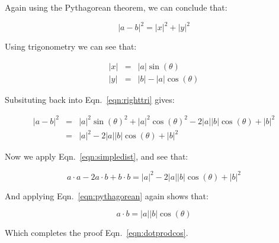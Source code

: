 \documentclass{article}[11pt]
\begin{document}
Again using the Pythagorean theorem, we can conclude that:

\begin{equation}
\label{eqn:righttri}
|a - b|^2 = |x|^2 + |y|^2
\end{equation}

Using trigonometry we can see that:

\begin{eqnarray*}
|x| & = & |a| \sin(\theta) \\
|y| & = & |b| - |a| \cos(\theta)
\end{eqnarray*}

Subsituting back into Eqn.~\ref{eqn:righttri} gives:

\begin{eqnarray*}
|a - b|^2  & = & |a|^2 \sin(\theta)^2 + |a|^2 \cos(\theta)^2 - 2 |a| |b| \cos(\theta) + |b|^2 \\
& = & |a|^2 - 2 |a| |b| \cos(\theta) + |b|^2
\end{eqnarray*}

Now we apply Eqn.~\ref{eqn:simpledist}, and see that:

\[  a \cdot a - 2 a \cdot b + b \cdot b = |a|^2 - 2 |a| |b| \cos(\theta) + |b|^2 \]

And applying Eqn.~\ref{eqn:pythagorean} again shows that:

\[ a \cdot b = |a| |b| \cos(\theta) \]

Which completes the proof Eqn.~\ref{eqn:dotprodcos}.
\end{document}

